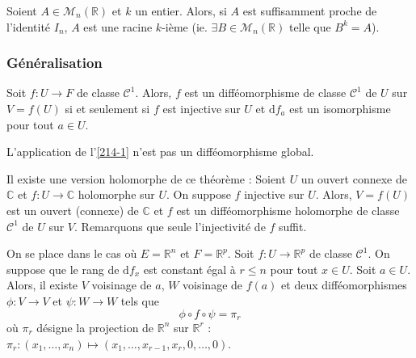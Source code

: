 
  \begin{application}
    Soient $A \in \mathcal{M}_n(\mathbb{R})$ et $k$ un entier. Alors, si $A$ est suffisamment proche de l'identité $I_n$, $A$ est une racine $k$-ième (ie. $\exists B \in \mathcal{M}_n(\mathbb{R})$ telle que $B^k = A$).
  \end{application}

  \subsubsection{Généralisation}


  \begin{theorem}
    Soit $f : U \rightarrow F$ de classe $\mathcal{C}^1$. Alors, $f$ est un difféomorphisme de classe $\mathcal{C}^1$ de $U$ sur $V = f(U)$ si et seulement si $f$ est injective sur $U$ et $\mathrm{d}f_a$ est un isomorphisme pour tout $a \in U$.
  \end{theorem}


  \begin{example}
    L'application de l'\cref{214-1} n'est pas un difféomorphisme global.
  \end{example}


  \begin{remark}
    Il existe une version holomorphe de ce théorème :
    \newpar
    Soient $U$ un ouvert connexe de $\mathbb{C}$ et $f : U \rightarrow \mathbb{C}$ holomorphe sur $U$. On suppose $f$ injective sur $U$. Alors, $V = f(U)$ est un ouvert (connexe) de $\mathbb{C}$ et $f$ est un difféomorphisme holomorphe de classe $\mathcal{C}^1$ de $U$ sur $V$.
    \newpar
    Remarquons que seule l'injectivité de $f$ suffit.
  \end{remark}


  \begin{theorem}
    On se place dans le cas où $E = \mathbb{R}^n$ et $F = \mathbb{R}^p$. Soit $f : U \rightarrow \mathbb{R}^p$ de classe $\mathcal{C}^1$. On suppose que le rang de $\mathrm{d}f_x$ est constant égal à $r \leq n$ pour tout $x \in U$. Soit $a \in U$. Alors, il existe $V$ voisinage de $a$, $W$ voisinage de $f(a)$ et deux difféomorphismes $\phi : V \rightarrow V$ et $\psi : W \rightarrow W$ tels que
    \[ \phi \circ f \circ \psi = \pi_r \]
    où $\pi_r$ désigne la projection de $\mathbb{R}^n$ sur $\mathbb{R}^r$ : $\pi_r : (x_1, \dots, x_n) \mapsto (x_1, \dots, x_{r-1}, x_r, 0, \dots, 0)$.
  \end{theorem}

